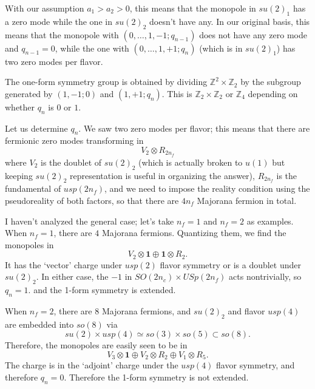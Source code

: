 \documentclass[12pt]{article}
\numberwithin{equation}{section}
\def\bZ{\mathbb{Z}}
\begin{document}
With our assumption $a_1>a_2>0$, this means that the monopole in $su(2)_1$ has a zero mode while the one in $su(2)_2$ doesn't have any.
In our original basis, this means that the monopole with $(0,\ldots,1,-1;q_{n-1})$ does not have any zero mode and $q_{n-1}=0$,
while the one with $(0,\ldots,1,+1;q_n)$  (which is in $su(2)_1$) has two zero modes per flavor.

The one-form symmetry group is obtained by dividing $\bZ^2\times \bZ_2$ by the subgroup generated by $(1,-1;0)$ and $(1,+1;q_n)$.
This is $\bZ_2\times \bZ_2$ or $\bZ_4$ depending on whether $q_n$ is $0$ or $1$.

Let us determine $q_n$.
We saw two zero modes per flavor; 
this means that there are fermionic zero modes transforming in \begin{equation}
V_{2} \otimes R_{2n_f} 
\end{equation} where $V_2$ is the doublet of $su(2)_2$ (which is actually broken to $u(1)$ but keeping $su(2)_2$ representation is useful in organizing the answer), 
$R_{2n_f}$ is the fundamental of $usp(2n_f)$,
and we need to impose the reality condition using the pseudoreality of both factors,
so that there are $4n_f$ Majorana fermion in total.

I haven't analyzed the general case; let's take $n_f=1$ and $n_f=2$ as examples.
When $n_f=1$, there are $4$ Majorana fermions.
Quantizing them, we find the monopoles in \begin{equation}
V_2 \otimes \mathbf{1} \oplus \mathbf{1}\otimes R_2.
\end{equation}
It has the `vector' charge under $usp(2)$ flavor symmetry or is a doublet under $su(2)_2$.
In either case, the $-1$ in $SO(2n_c)\times USp(2n_f)$ acts nontrivially, so $q_n=1$.
and the 1-form symmetry is extended.

When $n_f=2$, there are $8$ Majorana fermions, 
and  $su(2)_2$ and flavor $usp(4)$ are embedded into $so(8)$ via \begin{equation}
su(2)\times usp(4) \simeq so(3)\times so(5) \subset so(8).
\end{equation}
Therefore, the monopoles are easily seen to be in \begin{equation}
V_3\otimes \mathbf{1} \oplus V_2\otimes R_2 \oplus V_1\otimes R_5.
\end{equation}
The charge  is in the `adjoint' charge under the $usp(4)$ flavor symmetry,
and therefore $q_n=0$.
Therefore the 1-form symmetry is not extended.
\end{document}
